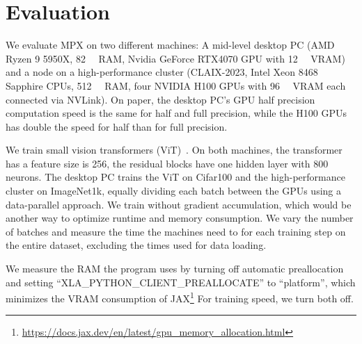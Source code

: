 \documentclass[10pt, a4paper, logo, onecolumn, internal, copyright]{dsme}
\newcommand{\mpx}{\textsc{MPX}}
\begin{document}
\section{Evaluation}
We evaluate \mpx{} on two different machines: A mid-level desktop PC (AMD Ryzen 9 5950X, \qty{82}{\giga\byte} RAM, Nvidia GeForce RTX4070 GPU with \qty{12}{\giga\byte} VRAM) and a node on a high-performance cluster (CLAIX-2023, Intel Xeon 8468 Sapphire CPUs, \qty{512}{\giga\byte} RAM, four NVIDIA H100 GPUs with \qty{96}{\giga\byte} VRAM each connected via NVLink).
On paper, the desktop PC's GPU half precision computation speed is the same for half and full precision, while the H100 GPUs has double the speed for half than for full precision.

We train small vision transformers (ViT)~\cite{dosovitskiy2020image,steiner2021train}.
On both machines, the transformer has a feature size is 256, the residual blocks have one hidden layer with 800 neurons.
The desktop PC trains the ViT on Cifar100 and the high-performance cluster on ImageNet1k, equally dividing each batch between the GPUs using a data-parallel approach.
We train without gradient accumulation, which would be another way to optimize runtime and memory consumption.
We vary the number of batches and measure the time the machines need to for each training step on the entire dataset, excluding the times used for data loading.

We measure the RAM the program uses by turning off automatic preallocation and setting ``XLA\_PYTHON\_CLIENT\_PREALLOCATE'' to ``platform'', which minimizes the VRAM consumption of JAX\footnote{\url{https://docs.jax.dev/en/latest/gpu_memory_allocation.html}}
For training speed, we turn both off.
\end{document}
